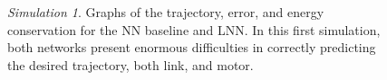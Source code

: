 \documentclass[a4paper]{article}
\begin{document}
\begin{figure}
    \centering
    \qquad
    \caption{\textit{Simulation 1}. Graphs of the trajectory, error, and energy conservation for the NN baseline and LNN. In this first simulation, both networks present enormous difficulties in correctly predicting the desired trajectory, both link, and motor.}
    \label{fig:elastic_300_150_175}
\end{figure}
\end{document}
